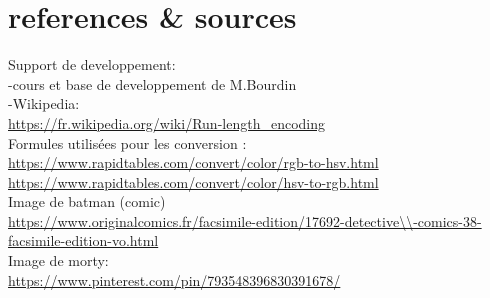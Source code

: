 \documentclass[12pt, letterpaper]{article}
\begin{document}
\section{references \& sources}
Support de developpement:\\
-cours et base de developpement de M.Bourdin\\
-Wikipedia:\\
\url{https://fr.wikipedia.org/wiki/Run-length_encoding}\\
Formules utilisées pour les conversion :\\ 
\url{https://www.rapidtables.com/convert/color/rgb-to-hsv.html}\\
\url{https://www.rapidtables.com/convert/color/hsv-to-rgb.html}\\
Image de batman (comic)\\
\url{https://www.originalcomics.fr/facsimile-edition/17692-detective\\-comics-38-facsimile-edition-vo.html}\\
Image de morty: \\
\url{https://www.pinterest.com/pin/793548396830391678/}\\
\end{document}
